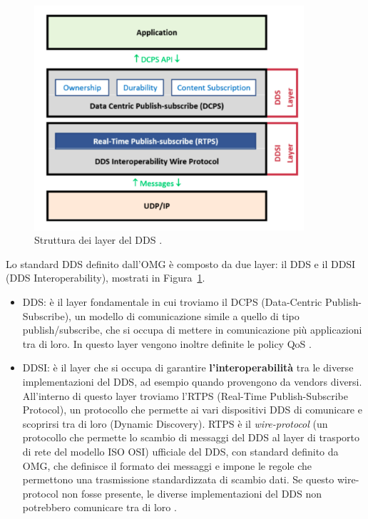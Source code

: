 \begin{figure}[H]
    \centering
    \includegraphics[width=10cm, keepaspectratio]{img/dcpsrtpslayers.png}
    \caption{Struttura dei layer del DDS \cite{4753364}.}
    \label{dcpsrtpslayers}
\end{figure}



Lo standard DDS definito dall'OMG è composto da due layer: 
il DDS e il
DDSI (DDS Interoperability), mostrati in Figura~\ref{dcpsrtpslayers}.
    \begin{itemize}
        \item DDS: è il layer fondamentale in cui troviamo il DCPS
        (Data-Centric Publish-Subscribe),
        un modello di comunicazione simile a quello di tipo publish/subscribe,
        che si occupa di mettere in comunicazione più applicazioni 
        tra di loro. In questo layer vengono inoltre 
        definite le policy QoS \cite{Michaud2017Apr}.
        \item DDSI: è il layer che si occupa di garantire \textbf{l'interoperabilità}
        tra le diverse implementazioni del DDS, ad
        esempio quando provengono da vendors diversi.
        All'interno di questo layer troviamo l'RTPS 
        (Real-Time Publish-Subscribe Protocol), un protocollo che permette ai 
        vari dispositivi DDS di comunicare e scoprirsi tra di loro
        (Dynamic Discovery).
        RTPS è il \textit{wire-protocol} (un protocollo che permette lo scambio di 
        messaggi del DDS al layer di trasporto di rete 
        del modello ISO OSI) ufficiale del DDS, 
        con standard definito da OMG,
        che definisce il formato dei messaggi e impone le regole che 
        permettono una trasmissione standardizzata di scambio dati. 
        Se questo wire-protocol non fosse presente,
        le diverse implementazioni del DDS non potrebbero 
        comunicare tra di loro \cite{essay93639}.
    \end{itemize} 



